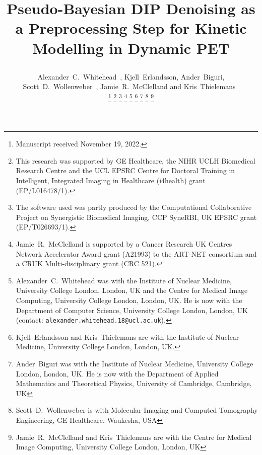 \documentclass[10pt, twocolumn, twoside, letterpaper]{IEEEtran}
\begin{document}
\title{

    Pseudo-Bayesian DIP Denoising as a Preprocessing Step for Kinetic Modelling in Dynamic PET
}

\pagestyle{plain}

\author{
    
    Alexander~C.~Whitehead~,
    Kjell~Erlandsson,
    Ander~Biguri,
    Scott~D.~Wollenweber~,
    Jamie~R.~McClelland and
    Kris~Thielemans~

    \thanks{Manuscript received November 19, 2022.}
    \thanks{This research was supported by GE Healthcare, the NIHR UCLH Biomedical Research Centre and the UCL EPSRC Centre for Doctoral Training in Intelligent, Integrated Imaging in Healthcare (i4health) grant (EP/L016478/1).}
    \thanks{The software used was partly produced by the Computational Collaborative Project on Synergistic Biomedical Imaging, CCP SyneRBI, UK EPSRC grant (EP/T026693/1).}
    \thanks{Jamie~R.~McClelland is supported by a Cancer Research UK Centres Network Accelerator Award grant (A21993) to the ART-NET consortium and a CRUK Multi-disciplinary grant (CRC 521).}
    \thanks{Alexander~C.~Whitehead was with the Institute of Nuclear Medicine, University College London, London, UK and the Centre for Medical Image Computing, University College London, London, UK. He is now with the Department of Computer Science, University College London, London, UK (contact: \texttt{alexander.whitehead.18@ucl.ac.uk}).}
    \thanks{Kjell~Erlandsson and Kris~Thielemans are with the Institute of Nuclear Medicine, University College London, London, UK.}
    \thanks{Ander~Biguri was with the Institute of Nuclear Medicine, University College London, London, UK. He is now with the Department of Applied Mathematics and Theoretical Physics, University of Cambridge, Cambridge, UK}
    \thanks{Scott~D.~Wollenweber is with Molecular Imaging and Computed Tomography Engineering, GE Healthcare, Waukesha, USA}
    \thanks{Jamie~R.~McClelland and Kris~Thielemans are with the Centre for Medical Image Computing, University College London, London, UK}
}

\maketitle
\end{document}
